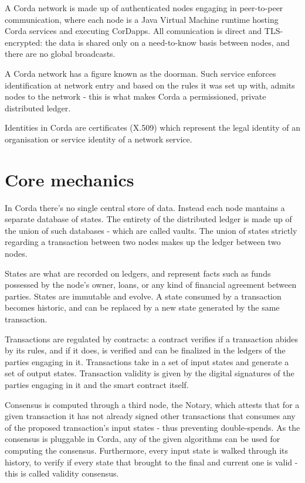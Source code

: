 A Corda network is made up of authenticated nodes engaging in peer-to-peer communication, where each node is a Java Virtual Machine runtime hosting Corda services and executing CorDapps. All comunication is direct and TLS-encrypted: the data is shared only on a need-to-know basis between nodes, and there are no global broadcasts.

A Corda network has a figure known as the doorman. Such service enforces identification at network entry and based on the rules it was set up with, admits nodes to the network - this is what makes Corda a permissioned, private distributed ledger.

Identities in Corda are certificates (X.509) which represent the legal identity of an organisation or service identity of a network service.

\section{Core mechanics}

In Corda there's no single central store of data. Instead each node mantains a separate database of states. The entirety of the distributed ledger is made up of the union of such databases - which are called vaults. The union of states strictly regarding a transaction between two nodes makes up the ledger between two nodes.

States are what are recorded on ledgers, and represent facts such as funds possessed by the node's owner, loans, or any kind of financial agreement between parties. States are immutable and evolve. A state consumed by a transaction becomes historic, and can be replaced by a new state generated by the same transaction.

Transactions are regulated by contracts: a contract verifies if a transaction abides by its rules, and if it does, is verified and can be finalized in the ledgers of the parties engaging in it. Transactions take in a set of input states and generate a set of output states. Transaction validity is given by the digital signatures of the parties engaging in it and the smart contract itself. 

Consensus is computed through a third node, the Notary, which attests that for a given transaction it has not already signed other transactions that consumes any of the proposed transaction's input states - thus preventing double-spends.
As the consensus is pluggable in Corda, any of the given algorithms can be used for computing the consensus. 
Furthermore, every input state is walked through its history, to verify if every state that brought to the final and current one is valid - this is called validity consensus.

